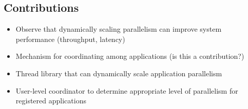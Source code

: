 \subsection*{Contributions}
\begin{itemize}
  \item Observe that dynamically scaling parallelism can improve system performance (throughput, latency)
  \item Mechanism for coordinating among applications (is this a contribution?)
  \item Thread library that can dynamically scale application parallelism
  \item User-level coordinator to determine appropriate level of parallelism for registered applications
\end{itemize}
